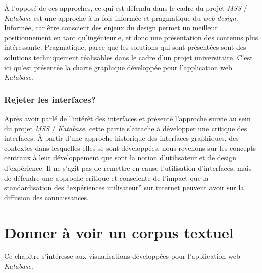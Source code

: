 \documentclass[a4paper, 12pt, twoside]{book}
\newcommand{\ktb}{\textit{Katabase}}
\newcommand{\mss}{\textit{MSS}}
\newcommand{\mssktb}{\mss{} / \ktb{}}
\begin{document}
À l'opposé de ces approches, ce qui est défendu dans le cadre du projet \mssktb{} est une approche à la fois informée et pragmatique du \textit{web design}. Informée, car être conscient des enjeux du design permet un meilleur positionnement en tant qu'ingénieur.e, et donc une présentation des contenus plus intéressante. Pragmatique, parce que les solutions qui sont présentées sont des solutions techniquement réalisables dans le cadre d'un projet universitaire. C'est ici qu'est présentée la charte graphique développée pour l'application web \ktb{}.

\subsection{Rejeter les interfaces?}
Après avoir parlé de l'intérêt des interfaces et présenté l'approche suivie au sein du projet \mssktb{}, cette partie s'attache à développer une critique des interfaces. À partir d'une approche historique des interfaces graphiques, des contextes dans lesquelles elles se sont développées, nous revenons sur les concepts centraux à leur développement que sont la notion d'utilisateur et de design d'expérience. Il ne s'agit pas de remettre en cause l'utilisation d'interfaces, mais de défendre une approche critique et consciente de l'impact que la standardisation des \enquote{expériences utilisateur} sur internet peuvent avoir sur la diffusion des connaissances.

\chapter{Donner à voir un corpus textuel}
Ce chapitre s'intéresse aux visualisations développées pour l'application web \ktb{}.
\end{document}

